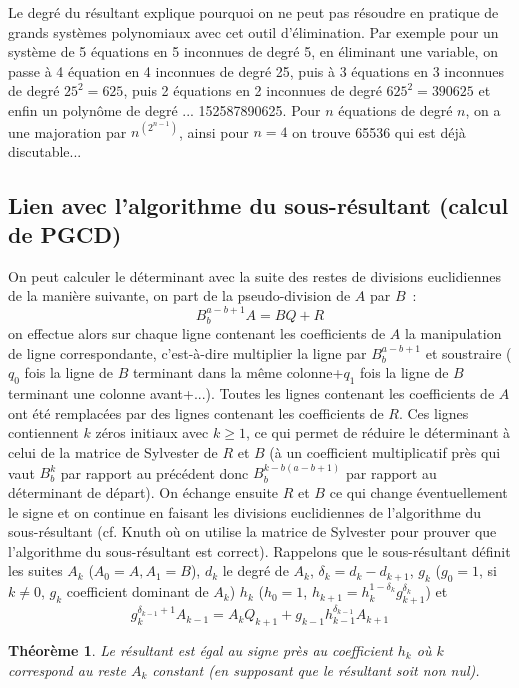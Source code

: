 \documentclass[a4paper,11pt]{article}
\newtheorem{thm}{Théorème}
\begin{document}
\begin{giacjshere}
Le degr\'e du r\'esultant explique pourquoi on ne peut pas r\'esoudre
en pratique de grands syst\`emes polynomiaux avec cet outil
d'\'elimination.
Par exemple pour un syst\`eme de 5 \'equations en 5 inconnues de
degr\'e 5, en \'eliminant une variable, on passe \`a 4 \'equation en
4 inconnues de degr\'e 25, puis \`a 3 \'equations en 3 inconnues
de degr\'e $25^2=625$, puis 2 \'equations en 2 inconnues de
degr\'e $625^2=390625$ et enfin un polyn\^ome de degr\'e ...
152587890625. Pour $n$ \'equations de degr\'e $n$, on a une majoration
par $n^{(2^{n-1})}$, ainsi pour $n=4$ on trouve 65536 qui est d\'ej\`a discutable...

\subsection{Lien avec l'algorithme du sous-résultant (calcul de PGCD)}
On peut calculer le déterminant avec la suite des restes de divisions
euclidiennes de la manière suivante, on part de la pseudo-division
de $A$ par $B$~:
\[ B_b^{a-b+1} A=BQ+R \]
on effectue alors sur chaque ligne contenant les coefficients de $A$
la manipulation de ligne correspondante, c'est-à-dire multiplier
la ligne par $B_b^{a-b+1}$ et soustraire ($q_0$ fois la ligne
de $B$ terminant dans la même colonne+$q_1$ fois la ligne
de $B$ terminant une colonne avant+...). Toutes les lignes
contenant les coefficients de $A$ ont été remplacées par des lignes 
contenant les coefficients de $R$. Ces lignes contiennent $k$ zéros initiaux
avec $k \geq 1$, ce qui permet de réduire le déterminant à celui
de la matrice de Sylvester de $R$ et $B$ (à un coefficient multiplicatif
près qui vaut $B_b^k$ par rapport au précédent donc
$B_b^{k-b(a-b+1)}$ par rapport au déterminant de départ). 
On échange ensuite $R$ et $B$ ce qui change
éventuellement le signe et on continue en faisant les
divisions euclidiennes de l'algorithme du sous-r\'esultant (cf.
Knuth o\`u on utilise la matrice de Sylvester pour prouver que
l'algorithme du sous-r\'esultant est correct). Rappelons que
le sous-résultant définit les suites $A_k$ ($A_0=A, A_1=B$),
$d_k$ le degré de $A_k$, $\delta_k=d_k-d_{k+1}$,
$g_k$ ($g_0=1$, si $k\neq 0$, $g_k$ coefficient dominant de $A_k$) 
$h_k$ ($h_0=1$, $h_{k+1}=h_k^{1-\delta_k} g_{k+1}^{\delta_k}$) et
\[ g_k^{\delta_{k-1}+1} A_{k-1} = A_k Q_{k+1} + 
g_{k-1} h_{k-1}^{\delta_{k-1}} A_{k+1} \]
\begin{thm}
Le résultant est égal au signe près au coefficient $h_k$ où $k$
correspond au reste $A_k$ constant (en supposant que le résultant
soit non nul).
\end{thm}


\end{giacjshere}
\end{document}
